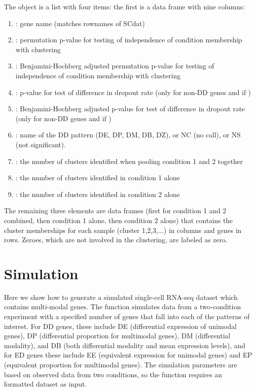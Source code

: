 \documentclass{article}
\begin{document}
The  object is a list with four items: the first is a data frame with nine columns: 
\begin{enumerate}
  \item {}: gene name (matches rownames of SCdat)
  \item {}: permutation p-value for testing of independence of condition membership with clustering
  \item {}: Benjamini-Hochberg adjusted permutation p-value for testing of independence of condition membership with clustering
  \item {}: p-value for test of difference in dropout rate (only for non-DD genes and if )
  \item {}: Benjamini-Hochberg adjusted p-value for test of difference in dropout rate (only for non-DD genes and if )
  \item {}: name of the DD pattern (DE, DP, DM, DB, DZ), or NC (no call), or NS (not significant).  
  \item {}: the number of clusters identified when pooling condition 1 and 2 together
  \item {}: the number of clusters identified in condition 1 alone
  \item {}: the number of clusters identified in condition 2 alone
\end{enumerate}
  The remaining three elements are data frames (first for condition 1 and 2 combined, then condition 1 alone, then condition 2 alone) that contains the cluster memberships for each sample (cluster 1,2,3,...) in columns and genes in rows.  Zeroes, which are not involved in the clustering, are labeled as zero.  

\section{Simulation}

Here we show how to generate a simulated single-cell RNA-seq dataset which contains multi-modal genes.  The  function simulates data from a two-condition experiment with a specified number of genes that fall into each of the patterns of interest.  For DD genes, these include DE (differential expression of unimodal genes), DP (differential proportion for multimodal genes), DM (differential modality), and DB (both differential modality and mean expression levels), and for ED genes these include EE (equivalent expression for unimodal genes) and EP (equivalent proportion for multimodal genes).  The simulation parameters are based on observed data from two conditions, so the function requires an  formatted dataset as input.
\end{document}
